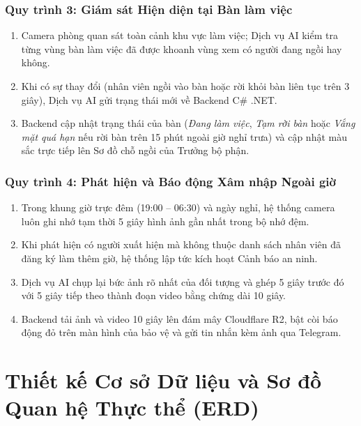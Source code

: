 \documentclass[12pt,a4paper]{article}
\begin{document}
\subsubsection{Quy trình 3: Giám sát Hiện diện tại Bàn làm việc}
\begin{enumerate}[nosep, leftmargin=1.8em]
    \item Camera phòng quan sát toàn cảnh khu vực làm việc; Dịch vụ AI kiểm tra từng vùng bàn làm việc đã được khoanh vùng xem có người đang ngồi hay không.
    \item Khi có sự thay đổi (nhân viên ngồi vào bàn hoặc rời khỏi bàn liên tục trên 3 giây), Dịch vụ AI gửi trạng thái mới về Backend C\# .NET.
    \item Backend cập nhật trạng thái của bàn (\textit{Đang làm việc}, \textit{Tạm rời bàn} hoặc \textit{Vắng mặt quá hạn} nếu rời bàn trên 15 phút ngoài giờ nghỉ trưa) và cập nhật màu sắc trực tiếp lên Sơ đồ chỗ ngồi của Trưởng bộ phận.
\end{enumerate}

\subsubsection{Quy trình 4: Phát hiện và Báo động Xâm nhập Ngoài giờ}
\begin{enumerate}[nosep, leftmargin=1.8em]
    \item Trong khung giờ trực đêm (19:00 -- 06:30) và ngày nghỉ, hệ thống camera luôn ghi nhớ tạm thời 5 giây hình ảnh gần nhất trong bộ nhớ đệm.
    \item Khi phát hiện có người xuất hiện mà không thuộc danh sách nhân viên đã đăng ký làm thêm giờ, hệ thống lập tức kích hoạt Cảnh báo an ninh.
    \item Dịch vụ AI chụp lại bức ảnh rõ nhất của đối tượng và ghép 5 giây trước đó với 5 giây tiếp theo thành đoạn video bằng chứng dài 10 giây.
    \item Backend tải ảnh và video 10 giây lên đám mây Cloudflare R2, bật còi báo động đỏ trên màn hình của bảo vệ và gửi tin nhắn kèm ảnh qua Telegram.
\end{enumerate}

\newpage
\section{Thiết kế Cơ sở Dữ liệu và Sơ đồ Quan hệ Thực thể (ERD)}
\end{document}
